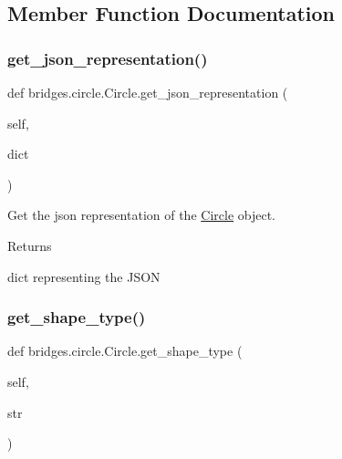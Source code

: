 \subsection{Member Function Documentation}
\mbox{\label{classbridges_1_1circle_1_1_circle_a7a1be40bcd6028dab0a5bcab6e69c355}} 
\subsubsection{\texorpdfstring{get\+\_\+json\+\_\+representation()}{get\_json\_representation()}}
{\footnotesize\ttfamily def bridges.\+circle.\+Circle.\+get\+\_\+json\+\_\+representation (\begin{DoxyParamCaption}\item[{}]{self,  }\item[{}]{dict }\end{DoxyParamCaption})}



Get the json representation of the \hyperlink{classbridges_1_1circle_1_1_circle}{Circle} object. 

\begin{DoxyReturn}{Returns}


dict representing the J\+S\+ON 
\end{DoxyReturn}
\mbox{\label{classbridges_1_1circle_1_1_circle_ae84bcb74b248cc701b4e12efe25f6896}} 
\subsubsection{\texorpdfstring{get\+\_\+shape\+\_\+type()}{get\_shape\_type()}}
{\footnotesize\ttfamily def bridges.\+circle.\+Circle.\+get\+\_\+shape\+\_\+type (\begin{DoxyParamCaption}\item[{}]{self,  }\item[{}]{str }\end{DoxyParamCaption})}




